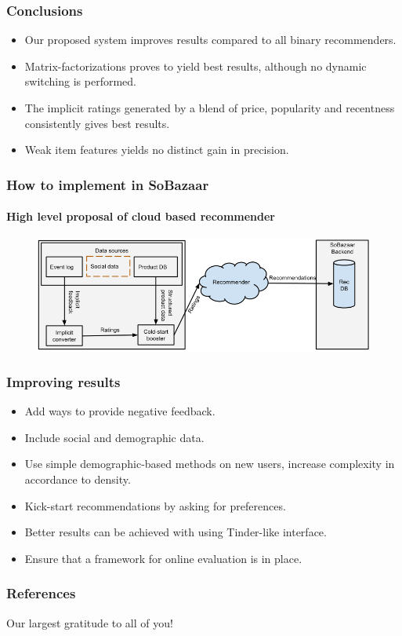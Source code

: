 \documentclass{beamer}
\begin{document}
  \begin{frame}
    \frametitle{Conclusions}
    \begin{itemize}
      \item Our proposed system improves results compared to all binary
      recommenders.
      \item Matrix-factorizations proves to yield best results, although no
      dynamic switching is performed.
      \item The implicit ratings generated by a blend of price, popularity and
      recentness consistently gives best results.
      \item Weak item features yields no distinct gain in precision.
    \end{itemize}
  \end{frame}


  \begin{frame}
    \frametitle{How to implement in SoBazaar}
    \framesubtitle{High level proposal of cloud based recommender}
    \begin{figure}[H]
        \includegraphics[scale=0.4]{../src/image/theCloud}
        \centering
    \end{figure}
  \end{frame}

  \begin{frame}
    \frametitle{Improving results}
    \begin{itemize}
      \item Add ways to provide negative feedback.
      \item Include social and demographic data.
      \item Use simple demographic-based methods on new users, increase
      complexity in accordance to density.
      \item Kick-start recommendations by asking for preferences.
      \item Better results can be achieved with using Tinder-like interface.
      \item Ensure that a framework for online evaluation is in place.
    \end{itemize}
  \end{frame}

  \begin{frame}[allowframebreaks]
    \frametitle{References}
    
    
  \end{frame}

  \begin{frame}
    \huge Our largest gratitude to all of you!
  \end{frame}
\end{document}
